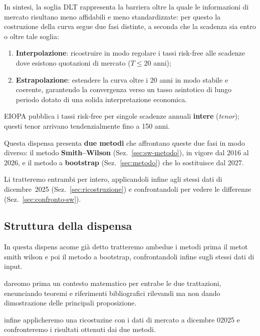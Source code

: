 \documentclass[11pt,a4paper]{article}
\theoremstyle{plain}
\theoremstyle{definition}
\theoremstyle{remark}
\begin{document}
In sintesi, la soglia DLT rappresenta la barriera oltre la quale le informazioni di mercato risultano
meno affidabili e meno standardizzate: per questo la costruzione della curva segue due fasi
distinte, a seconda che la scadenza sia entro o oltre tale soglia:
\begin{enumerate}
  \item \textbf{Interpolazione}: ricostruire in modo regolare i tassi risk-free alle scadenze dove
        esistono quotazioni di mercato ($T \le 20$ anni);
  \item \textbf{Estrapolazione}: estendere la curva oltre i 20 anni in modo stabile e
        coerente, garantendo la convergenza verso un tasso asintotico di lungo periodo dotato di una solida interpretazione economica.
\end{enumerate}

EIOPA pubblica i tassi risk-free per singole scadenze annuali \textbf{intere} (\emph{tenor}); questi
tenor arrivano tendenzialmente fino a 150 anni.

Questa dispensa presenta \textbf{due metodi} che affrontano queste due fasi in modo diverso: il
metodo \textbf{Smith--Wilson} (Sez.~\ref{sec:sw-metodo}), in vigore dal 2016 al 2026, e il
metodo a \textbf{bootstrap} (Sez.~\ref{sec:metodo}) che lo sostituisce dal 2027. 

Li tratteremo entrambi per intero, applicandoli infine
agli stessi dati di dicembre~2025 (Sez.~\ref{sec:ricostruzione}) e confrontandoli per vedere le differenze (Sez.~\ref{sec:confronto-sw}).

\subsection{Struttura della dispensa}

In questa dispens acome già detto tratteremo ambedue i metodi prima il metot smith wilson e poi il metodo a bootstrap, confrontandoli infine sugli stessi dati di input.

dareomo prima un contesto matematico per entrabe le due trattazioni, eneunciando teoremi e riferimenti bibliografici rilevandi ma non dando
dimostrazione delle principali proposizione.

infine applicheremo una ricostuzine con i dati di mercato a dicembre 02025 e confronteremo i risultati ottenuti dai due metodi.

\end{document}
